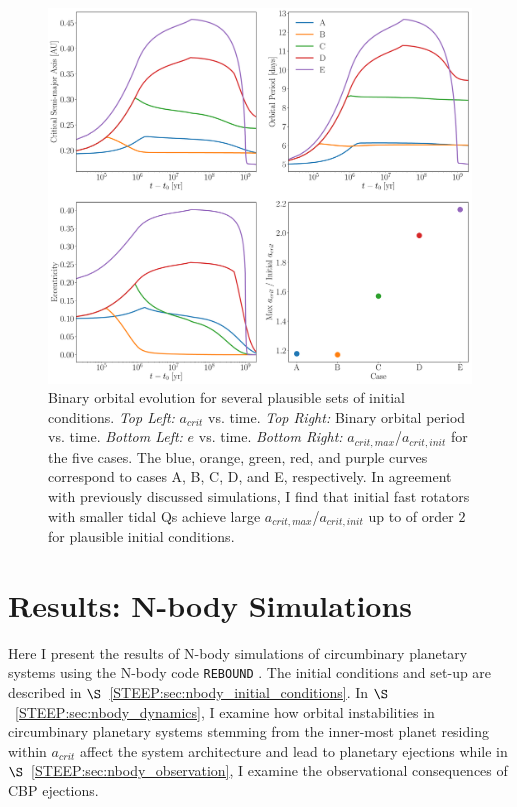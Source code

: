 \begin{figure}
	\includegraphics[width=\columnwidth]{opt.pdf}
   \caption{Binary orbital evolution for several plausible sets of initial conditions. {\it Top Left:} $a_{crit}$ vs. time.  {\it Top Right:} Binary orbital period vs. time. {\it Bottom Left:} $e$ vs. time. {\it Bottom Right:} $a_{crit,max}$/$a_{crit,init}$ for the five cases.  The blue, orange, green, red, and purple curves correspond to cases A, B, C, D, and E, respectively.  In agreement with previously discussed simulations, I find that initial fast rotators with smaller tidal Qs achieve large $a_{crit,max}$/$a_{crit,init}$ up to of order $2$ for plausible initial conditions.}
    \label{STEEP:fig:opt}
\end{figure}

\section{Results: N-body Simulations} \label{STEEP:sec:nbody_results}

Here I present the results of N-body simulations of circumbinary planetary systems using the N-body code \texttt{REBOUND} \citep{Rein2012,Rein2015}.  The initial conditions and set-up are described in $\S$~\ref{STEEP:sec:nbody_initial_conditions}.  In $\S$~\ref{STEEP:sec:nbody_dynamics}, I examine how orbital instabilities in circumbinary planetary systems stemming from the inner-most planet residing within $a_{crit}$ affect the system architecture and lead to planetary ejections while in $\S$~\ref{STEEP:sec:nbody_observation}, I examine the observational consequences of CBP ejections.

